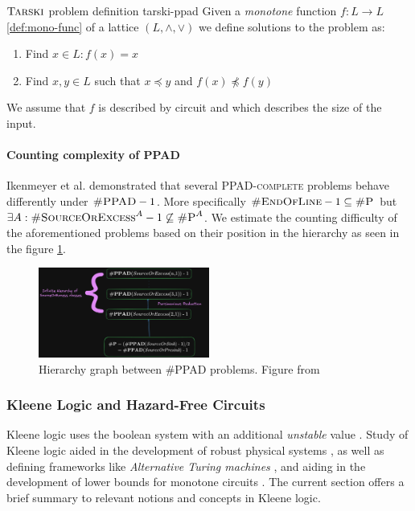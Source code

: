 \begin{definitionbox}{$\textnormal{\textsc{Tarski}}$ problem definition \cite{fearnley_FasterAlgorithmFinding_2022}}{tarski-ppad}
    Given a \textit{monotone} function $f: L \to L$ \ref{def:mono-func} of a lattice $(L, \wedge, \vee)$
    we define solutions to the problem as:
    \begin{enumerate}
        \item Find $x \in L: f(x) = x$
        \item Find $x,y \in L$ such that $x \preceq y$ and $f(x) \not\preceq f(y)$
    \end{enumerate}
    We assume that $f$ is described by circuit and which describes the size of the input.
\end{definitionbox}
%
\paragraph{Counting complexity of PPAD}
\label{par:count-ppad}


Ikenmeyer et al. \cite{ikenmeyer_WhatWhatNot_2022} demonstrated that several \textsc{PPAD-complete}
problems behave differently under $\textsc{\#PPAD} -1$. More specifically
$\textsc{\#EndOfLine} - 1 \subseteq \textsc{\#P}$ but $\exists A: \textsc{\#SourceOrExcess}^A  - 1\not\subseteq \textsc{\#P}^A$.
We estimate the counting difficulty of the aforementioned problems based on their position in the hierarchy as seen in the figure \ref{fig:ppad-count-hier}.

\begin{figure}[h!]
    \centering
    \includegraphics[width=0.5\textwidth]{assets/chart-plot.png}
    \caption{Hierarchy graph between \textsc{\#PPAD} problems. Figure from \cite{ikenmeyer_WhatWhatNot_2022}}\label{fig:ppad-count-hier}
\end{figure}


\subsubsection{Kleene Logic and Hazard-Free Circuits}

Kleene logic uses the boolean system with an additional \textit{unstable} value \cite{kleene_IntroductionMetamathematics_2009}. 
Study of Kleene logic aided in
the development of robust physical systems \cite{friedrichs_MetastabilityContainingCircuits_2018}, as well as
defining frameworks like \textit{Alternative Turing machines} \cite{kozen_TheoryComputation_2006}, and
aiding in the development of lower bounds for monotone circuits
\cite{eichelberger_HazardDetectionCombinational_1965, ikenmeyer_ComplexityHazardfreeCircuits_2019,ikenmeyer_KarchmerWigdersonGamesHazardfree_2022,  bund_SmallHazardFreeTransducers_2025}. 
The current section offers a brief summary to relevant notions and concepts in Kleene logic.

